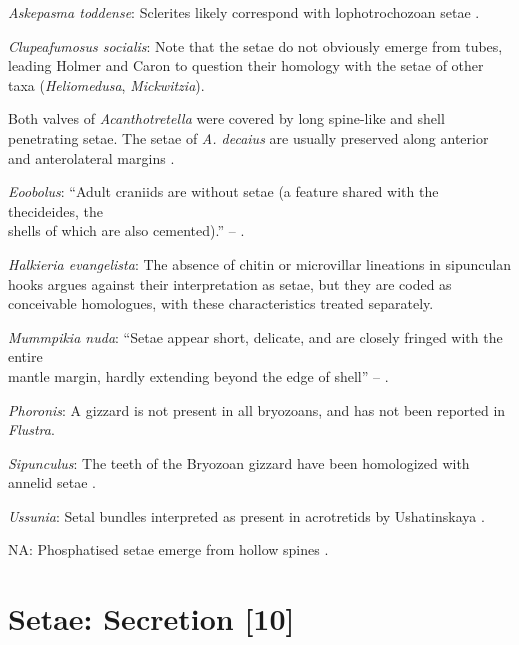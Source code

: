 \documentclass[openany]{book}
\theoremstyle{definition}
\theoremstyle{definition}
\theoremstyle{definition}
\theoremstyle{remark}
\begin{document}
\hypertarget{Askepasma_toddense-coding-9}{}
\emph{Askepasma toddense}: Sclerites likely correspond with
lophotrochozoan setae \citep{Butterfield1990, Smith2014, Zhang2015}.

\hypertarget{Clupeafumosus_socialis-coding-9}{}
\emph{Clupeafumosus socialis}: Note that the setae do not obviously
emerge from tubes, leading Holmer and Caron to question their homology
with the setae of other taxa (\emph{Heliomedusa}, \emph{Mickwitzia}).

Both valves of \emph{Acanthotretella} were covered by long spine-like
and shell penetrating setae. The setae of \emph{A. decaius} are usually
preserved along anterior and anterolateral margins
\citep{Hu2010Softpart}.

\hypertarget{Eoobolus-coding-9}{}
\emph{Eoobolus}: ``Adult craniids are without setae (a feature shared
with the thecideides, the\\
shells of which are also cemented).'' -- \citet{Williams2007Supplement}.

\hypertarget{Halkieria_evangelista-coding-9}{}
\emph{Halkieria evangelista}: The absence of chitin or microvillar
lineations in sipunculan hooks argues against their interpretation as
setae, but they are coded as conceivable homologues, with these
characteristics treated separately.

\hypertarget{Mummpikia_nuda-coding-9}{}
\emph{Mummpikia nuda}: ``Setae appear short, delicate, and are closely
fringed with the entire\\
mantle margin, hardly extending beyond the edge of shell'' --
\citet{Zhang2005}.

\hypertarget{Phoronis-coding-9}{}
\emph{Phoronis}: A gizzard is not present in all bryozoans, and has not
been reported in \emph{Flustra}.

\hypertarget{Sipunculus-coding-9}{}
\emph{Sipunculus}: The teeth of the Bryozoan gizzard have been
homologized with annelid setae \citep{Gordon1975}.

\hypertarget{Ussunia-coding-9}{}
\emph{Ussunia}: Setal bundles interpreted as present in acrotretids by
Ushatinskaya \citeyearpar{Ushatinskaya2016Protegulumand}.

\hypertarget{NA-coding-9}{}
NA: Phosphatised setae emerge from hollow spines
\citep{Popov2009Earlyontogeny}.

\section{Setae: Secretion {[}10{]}}\label{setae-secretion-10}
\end{document}
